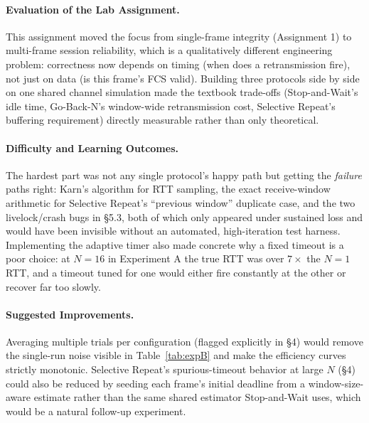\documentclass[11pt]{article}
\begin{document}
\paragraph{Evaluation of the Lab Assignment.} This assignment moved the focus from
single-frame integrity (Assignment 1) to multi-frame session reliability, which is a
qualitatively different engineering problem: correctness now depends on timing (when does a
retransmission fire), not just on data (is this frame's FCS valid). Building three
protocols side by side on one shared channel simulation made the textbook trade-offs
(Stop-and-Wait's idle time, Go-Back-N's window-wide retransmission cost, Selective Repeat's
buffering requirement) directly measurable rather than only theoretical.

\paragraph{Difficulty and Learning Outcomes.} The hardest part was not any single
protocol's happy path but getting the \emph{failure} paths right: Karn's algorithm for RTT
sampling, the exact receive-window arithmetic for Selective Repeat's ``previous window''
duplicate case, and the two livelock/crash bugs in \S5.3, both of which only appeared under
sustained loss and would have been invisible without an automated, high-iteration test
harness. Implementing the adaptive timer also made concrete why a fixed timeout is a poor
choice: at $N{=}16$ in Experiment A the true RTT was over $7\times$ the $N{=}1$ RTT, and a
timeout tuned for one would either fire constantly at the other or recover far too slowly.

\paragraph{Suggested Improvements.} Averaging multiple trials per configuration (flagged
explicitly in \S4) would remove the single-run noise visible in Table~\ref{tab:expB} and
make the efficiency curves strictly monotonic. Selective Repeat's spurious-timeout behavior
at large $N$ (\S4) could also be reduced by seeding each frame's initial deadline from a
window-size-aware estimate rather than the same shared estimator Stop-and-Wait uses, which
would be a natural follow-up experiment.
\end{document}

